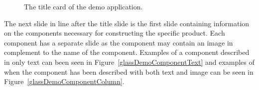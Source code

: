 		\begin{figure}[ht!]
		\centering
   		 \qquad
   		 \qquad
		\caption{The title card of the demo application.}
		\label{glassDemoTitleCard}
	\end{figure}
	
The next slide in line after the title slide is the first slide containing information on the components necessary for constructing the specific product. Each component has a separate slide as the component may contain an image in complement to the name of the component. Examples of a component described in only text can been seen in Figure~\ref{glassDemoComponentText} and examples of when the component has been described with both text and image can be seen in Figure~\ref{glassDemoComponentColumn}.

